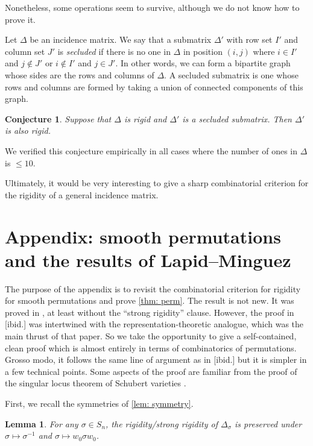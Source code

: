 \documentclass[12pt]{article}
\newtheorem{lemma}[theorem]{Lemma}
\newtheorem{conjecture}[theorem]{Conjecture}
\newcommand{\IM}{\Delta}
\begin{document}
Nonetheless, some operations seem to survive, although we do not know how to prove it.

Let $\IM$ be an incidence matrix. We say that a submatrix $\IM'$ with row set $I'$ and column set $J'$ is \emph{secluded} if there is no one in $\IM$
in position $(i,j)$ where $i\in I'$ and $j\notin J'$ or $i\notin I'$ and $j\in J'$.
In other words, we can form a bipartite graph whose sides are the rows and columns of $\IM$. A secluded submatrix is one whose rows and columns are formed by
taking a union of connected components of this graph.

\begin{conjecture}
Suppose that $\IM$ is rigid and $\IM'$ is a secluded submatrix. Then $\IM'$ is also rigid.
\end{conjecture}
We verified this conjecture empirically in all cases where the number of ones in $\IM$ is $\le10$.


Ultimately, it would be very interesting to give a sharp combinatorial criterion for the rigidity of a general incidence matrix.

\appendix

\section{Appendix: smooth permutations and the results of Lapid--Minguez}\label{sec:appendix}

The purpose of the appendix is to revisit the combinatorial criterion for rigidity for smooth permutations and prove \cref{thm: perm}.
The result is not new. It was proved in \cite{MR3866895}, at least without the ``strong rigidity'' clause.
However, the proof in [ibid.] was intertwined with the representation-theoretic analogue, which was the main thrust of that paper.
So we take the opportunity to give a self-contained, clean proof which is almost entirely in terms of combinatorics of permutations.
Grosso modo, it follows the same line of argument as in [ibid.] but it is simpler in a few technical points.
Some aspects of the proof are familiar from the proof of the singular locus theorem of Schubert varieties \cites{MR1827861,MR1990570,MR1994224,MR2015302,MR1853139}.

First, we recall the symmetries of \cref{lem: symmetry}.
\begin{lemma} \label{lem: symm}
For any $\sigma\in S_n$, the rigidity/strong rigidity of $\IM_\sigma$ is preserved under $\sigma\mapsto\sigma^{-1}$ and $\sigma\mapsto w_0\sigma w_0$.
\end{lemma}
\end{document}
